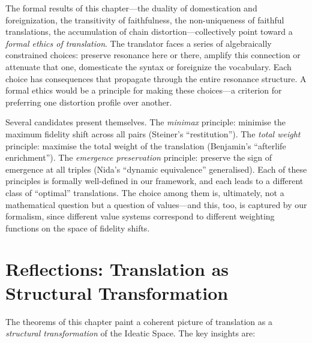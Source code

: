\begin{remark}
The formal results of this chapter---the duality of domestication and foreignization, the transitivity of faithfulness, the non-uniqueness of faithful translations, the accumulation of chain distortion---collectively point toward a \emph{formal ethics of translation}.  The translator faces a series of algebraically constrained choices: preserve resonance here or there, amplify this connection or attenuate that one, domesticate the syntax or foreignize the vocabulary.  Each choice has consequences that propagate through the entire resonance structure.  A formal ethics would be a principle for making these choices---a criterion for preferring one distortion profile over another.

Several candidates present themselves.  The \emph{minimax} principle: minimise the maximum fidelity shift across all pairs (Steiner's ``restitution'').  The \emph{total weight} principle: maximise the total weight of the translation (Benjamin's ``afterlife enrichment'').  The \emph{emergence preservation} principle: preserve the sign of emergence at all triples (Nida's ``dynamic equivalence'' generalised).  Each of these principles is formally well-defined in our framework, and each leads to a different class of ``optimal'' translations.  The choice among them is, ultimately, not a mathematical question but a question of values---and this, too, is captured by our formalism, since different value systems correspond to different weighting functions on the space of fidelity shifts.
\end{remark}

\section{Reflections: Translation as Structural Transformation}

The theorems of this chapter paint a coherent picture of translation as a
\emph{structural transformation} of the Ideatic Space.  The key insights are:

